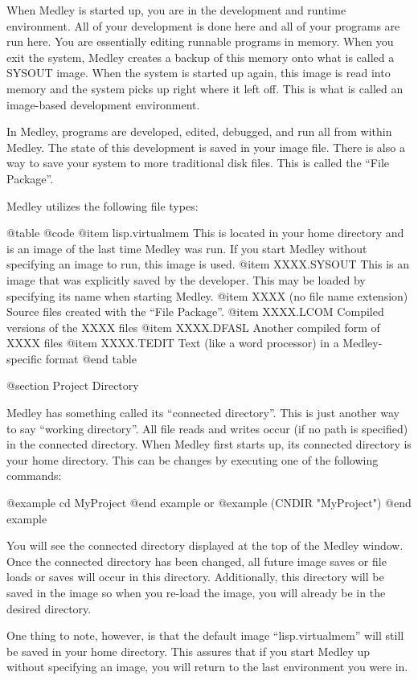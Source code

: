 When Medley is started up, you are in the development and runtime
environment.  All of your development is done here and all of your
programs are run here.  You are essentially editing runnable programs
in memory.  When you exit the system, Medley creates a backup of this
memory onto what is called a SYSOUT image.  When the system is started
up again, this image is read into memory and the system picks up right
where it left off.  This is what is called an image-based development
environment.

In Medley, programs are developed, edited, debugged, and run all from
within Medley.  The state of this development is saved in your image file.
There is also a way to save your system to more traditional
disk files.  This is called the ``File Package''.

Medley utilizes the following file types:

@table @code
@item lisp.virtualmem
This is located in your home directory and is an image of the last
time Medley was run.  If you start Medley without specifying an image to run, 
this image is used.
@item XXXX.SYSOUT
This is an image that was explicitly saved by the developer.  This may
be loaded by specifying its name when starting Medley.
@item XXXX (no file name extension)
Source files created with the ``File Package''.
@item XXXX.LCOM
Compiled versions of the XXXX files
@item XXXX.DFASL
Another compiled form of XXXX files
@item XXXX.TEDIT
Text (like a word processor) in a Medley-specific format
@end table

@section Project Directory

Medley has something called its ``connected directory''.  This is just
another way to say ``working directory''.  All file reads and writes
occur (if no path is specified) in the connected directory.  When Medley
first starts up, its connected directory is your home directory.  This
can be changes by executing one of the following commands:

@example
cd MyProject
@end example
or
@example
(CNDIR "MyProject")
@end example

You will see the connected directory displayed at the top of the Medley
window.  Once the connected directory has been changed, all future
image saves or file loads or saves will occur in this directory.  Additionally,
this directory will be saved in the image so when you re-load the image, you 
will already be in the desired directory.

One thing to note, however, is that the default image
``lisp.virtualmem'' will still be saved in your home directory.  This
assures that if you start Medley up without specifying an image, you
will return to the last environment you were in.



